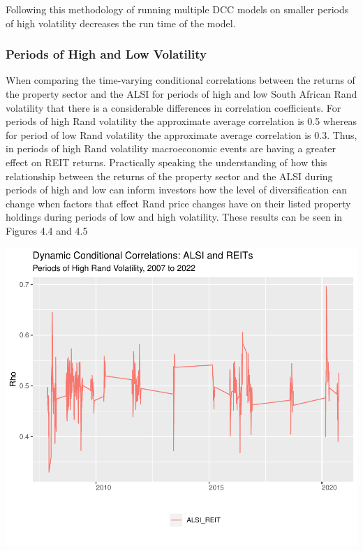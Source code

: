 \documentclass[11pt,preprint, authoryear]{elsarticle}
\let\origfigure\figure
\let\endorigfigure\endfigure
\renewenvironment{figure}[1][2] {
    \expandafter\origfigure\expandafter[H]
} {
    \endorigfigure
}
\numberwithin{equation}{section}
\numberwithin{figure}{section}
\numberwithin{table}{section}
\begin{document}
Following this methodology of running multiple DCC models on smaller
periods of high volatility decreases the run time of the model.

\hypertarget{periods-of-high-and-low-volatility}{%
\subsubsection{Periods of High and Low
Volatility}\label{periods-of-high-and-low-volatility}}

When comparing the time-varying conditional correlations between the
returns of the property sector and the ALSI for periods of high and low
South African Rand volatility that there is a considerable differences
in correlation coefficients. For periods of high Rand volatility the
approximate average correlation is 0.5 whereas for period of low Rand
volatility the approximate average correlation is 0.3. Thus, in periods
of high Rand volatility macroeconomic events are having a greater effect
on REIT returns. Practically speaking the understanding of how this
relationship between the returns of the property sector and the ALSI
during periods of high and low can inform investors how the level of
diversification can change when factors that effect Rand price changes
have on their listed property holdings during periods of low and high
volatility. These results can be seen in Figures 4.4 and 4.5

\begin{figure}
\centering
\includegraphics{Fin_Metrics_Project_files/figure-latex/unnamed-chunk-12-1.pdf}
\caption{Dynamic Conditional Correlations Graph}
\end{figure}
\end{document}

